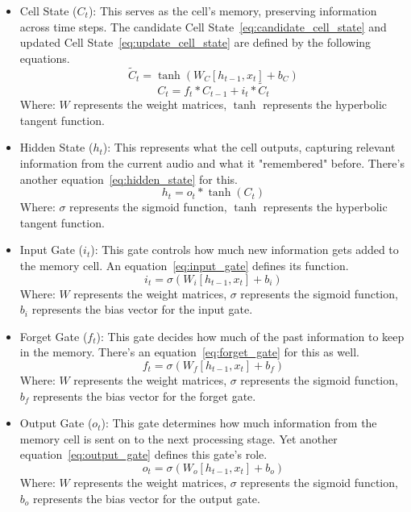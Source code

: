 \documentclass[conference, 10pt,onecolumn]{IEEEtran}
\begin{document}
\begin{itemize}
    \item Cell State (\(C_t\)): This serves as the cell's memory, preserving information across time steps. The candidate Cell State~\ref{eq:candidate_cell_state} and updated Cell State~\ref{eq:update_cell_state} are defined by the following equations.
    \begin{equation}
        \tilde{C}_t = \tanh(W_C [h_{t-1}, x_t] + b_C)
        \label{eq:candidate_cell_state}
    \end{equation}
    \begin{equation}
        C_t = f_t \ast C_{t-1} + i_t \ast \tilde{C}_t
        \label{eq:update_cell_state}
    \end{equation}
        Where: \(W\) represents the weight matrices, $\tanh$ represents the hyperbolic tangent function.
    \item Hidden State (\(h_t\)): This represents what the cell outputs, capturing relevant information from the current audio and what it "remembered" before. There's another equation~\ref{eq:hidden_state} for this.
    \begin{equation}
        h_t = o_t \ast \tanh(C_t)
        \label{eq:hidden_state}
    \end{equation}
        Where: \(\sigma\) represents the sigmoid function, $\tanh$ represents the hyperbolic tangent function.
    \item Input Gate (\(i_t\)): This gate controls how much new information gets added to the memory cell. An equation~\ref{eq:input_gate} defines its function.
    \begin{equation}
        i_t = \sigma(W_i [h_{t-1}, x_t] + b_i)
        \label{eq:input_gate}
    \end{equation}
        Where: \(W\) represents the weight matrices, \(\sigma\) represents the sigmoid function, \(b_i\) represents the bias vector for the input gate.
    \item Forget Gate (\(f_t\)): This gate decides how much of the past information to keep in the memory. There's an equation~\ref{eq:forget_gate} for this as well.
    \begin{equation}
        f_t = \sigma(W_f [h_{t-1}, x_t] + b_f)
        \label{eq:forget_gate}
    \end{equation}
        Where: \(W\) represents the weight matrices, \(\sigma\) represents the sigmoid function, \(b_f\) represents the bias vector for the forget gate.
    \item Output Gate (\(o_t\)): This gate determines how much information from the memory cell is sent on to the next processing stage. Yet another equation~\ref{eq:output_gate} defines this gate's role.
    \begin{equation}
        o_t = \sigma(W_o [h_{t-1}, x_t] + b_o)
        \label{eq:output_gate}
    \end{equation}
        Where: \(W\) represents the weight matrices, \(\sigma\) represents the sigmoid function, \(b_o\) represents the bias vector for the output gate.
\end{itemize}
\end{document}
